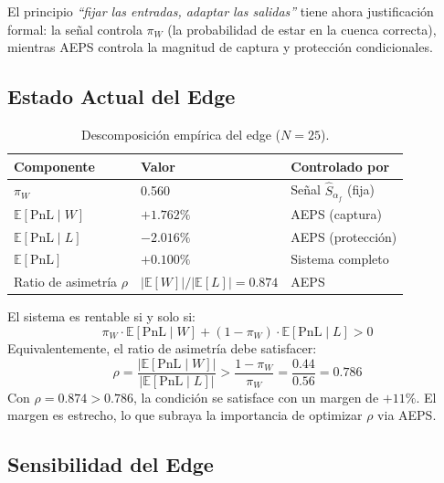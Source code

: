 \documentclass[11pt,a4paper]{article}
\newcommand{\score}{\hat{S}_{\alpha_f}}
\newcommand{\E}{\mathbb{E}}
\begin{document}
El principio \textit{``fijar las entradas, adaptar las salidas''}
tiene ahora justificaci\'on formal: la se\~nal controla $\pi_W$
(la probabilidad de estar en la cuenca correcta), mientras AEPS
controla la magnitud de captura y protecci\'on condicionales.

\subsection{Estado Actual del Edge}

\begin{table}[H]
\centering
\caption{Descomposici\'on emp\'irica del edge ($N=25$).}
\label{tab:edge_decomp}
\begin{tabular}{lll}
\toprule
\textbf{Componente} & \textbf{Valor} & \textbf{Controlado por} \\
\midrule
$\pi_W$ & 0.560 & Se\~nal $\score$ (fija) \\
$\E[\text{PnL} \mid W]$ & $+1.762\%$ & AEPS (captura) \\
$\E[\text{PnL} \mid L]$ & $-2.016\%$ & AEPS (protecci\'on) \\
\midrule
$\E[\text{PnL}]$ & $+0.100\%$ & Sistema completo \\
\midrule
Ratio de asimetr\'ia $\rho$ & $|\E[W]| / |\E[L]| = 0.874$ & AEPS \\
\bottomrule
\end{tabular}
\end{table}

\begin{tcolorbox}[keybox, title=Condici\'on de Rentabilidad]
El sistema es rentable si y solo si:
\begin{equation}
\pi_W \cdot \E[\text{PnL} \mid W] + (1-\pi_W) \cdot \E[\text{PnL} \mid L] > 0
\label{eq:profitability}
\end{equation}
Equivalentemente, el ratio de asimetr\'ia debe satisfacer:
\begin{equation}
\rho = \frac{|\E[\text{PnL} \mid W]|}{|\E[\text{PnL} \mid L]|}
  > \frac{1 - \pi_W}{\pi_W} = \frac{0.44}{0.56} = 0.786
\label{eq:rho_condition}
\end{equation}
Con $\rho = 0.874 > 0.786$, la condici\'on se satisface con un
margen de $+11\%$. El margen es estrecho, lo que subraya la
importancia de optimizar $\rho$ via AEPS.
\end{tcolorbox}


\subsection{Sensibilidad del Edge}
\end{document}
